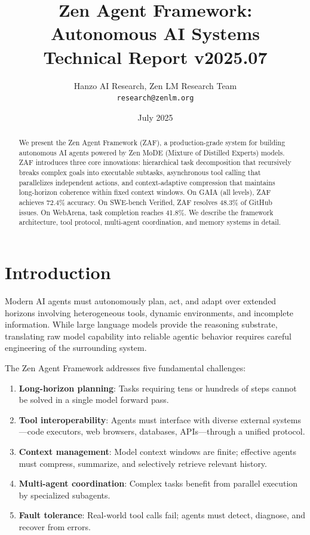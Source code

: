 \documentclass[11pt,a4paper]{article}
\title{\textbf{Zen Agent Framework: Autonomous AI Systems}\\
\large Technical Report v2025.07}
\author{Hanzo AI Research, Zen LM Research Team\\
\texttt{research@zenlm.org}}
\date{July 2025}
\begin{document}
\maketitle

\begin{abstract}
We present the Zen Agent Framework (ZAF), a production-grade system for building autonomous AI agents powered by Zen MoDE (Mixture of Distilled Experts) models. ZAF introduces three core innovations: hierarchical task decomposition that recursively breaks complex goals into executable subtasks, asynchronous tool calling that parallelizes independent actions, and context-adaptive compression that maintains long-horizon coherence within fixed context windows. On GAIA (all levels), ZAF achieves 72.4\% accuracy. On SWE-bench Verified, ZAF resolves 48.3\% of GitHub issues. On WebArena, task completion reaches 41.8\%. We describe the framework architecture, tool protocol, multi-agent coordination, and memory systems in detail.
\end{abstract}

\section{Introduction}

Modern AI agents must autonomously plan, act, and adapt over extended horizons involving heterogeneous tools, dynamic environments, and incomplete information. While large language models provide the reasoning substrate, translating raw model capability into reliable agentic behavior requires careful engineering of the surrounding system.

The Zen Agent Framework addresses five fundamental challenges:

\begin{enumerate}
  \item \textbf{Long-horizon planning}: Tasks requiring tens or hundreds of steps cannot be solved in a single model forward pass.
  \item \textbf{Tool interoperability}: Agents must interface with diverse external systems—code executors, web browsers, databases, APIs—through a unified protocol.
  \item \textbf{Context management}: Model context windows are finite; effective agents must compress, summarize, and selectively retrieve relevant history.
  \item \textbf{Multi-agent coordination}: Complex tasks benefit from parallel execution by specialized subagents.
  \item \textbf{Fault tolerance}: Real-world tool calls fail; agents must detect, diagnose, and recover from errors.
\end{enumerate}
\end{document}

